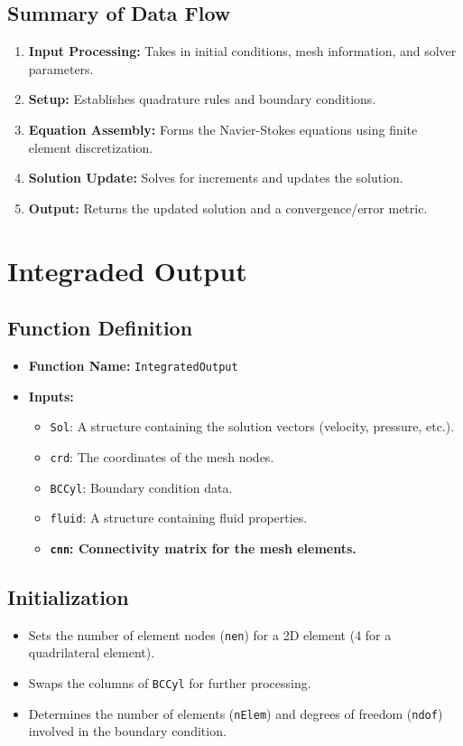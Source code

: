 \documentclass[a4paper,12pt]{article} %
\begin{document}
\subsection*{Summary of Data Flow}
\begin{enumerate}
    \item \textbf{Input Processing:} Takes in initial conditions, mesh information, and solver parameters.
    \item \textbf{Setup:} Establishes quadrature rules and boundary conditions.
    \item \textbf{Equation Assembly:} Forms the Navier-Stokes equations using finite element discretization.
    \item \textbf{Solution Update:} Solves for increments and updates the solution.
    \item \textbf{Output:} Returns the updated solution and a convergence/error metric.
\end{enumerate}


\section{Integraded Output}

\subsection*{Function Definition}
\begin{itemize}
    \item \textbf{Function Name:} \texttt{IntegratedOutput}
    \item \textbf{Inputs:}
    \begin{itemize}
        \item \texttt{Sol}: A structure containing the solution vectors (velocity, pressure, etc.).
        \item \texttt{crd}: The coordinates of the mesh nodes.
        \item \texttt{BCCyl}: Boundary condition data.
        \item \texttt{fluid}: A structure containing fluid properties.
        \item \textbf{\texttt{cnn}: Connectivity matrix for the mesh elements.}
    \end{itemize}
\end{itemize}

\subsection*{Initialization}
\begin{itemize}
    \item Sets the number of element nodes (\texttt{nen}) for a 2D element (4 for a quadrilateral element).
    \item Swaps the columns of \texttt{BCCyl} for further processing.
    \item Determines the number of elements (\texttt{nElem}) and degrees of freedom (\texttt{ndof}) involved in the boundary condition.
\end{itemize}
\end{document}
